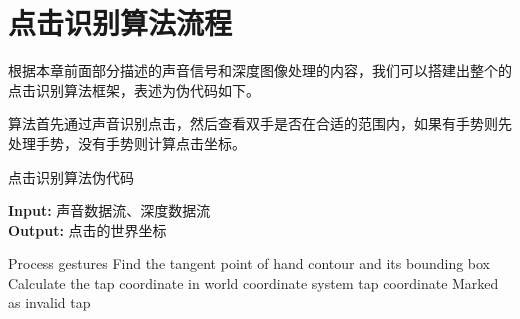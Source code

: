 \section{点击识别算法流程}
根据本章前面部分描述的声音信号和深度图像处理的内容，我们可以搭建出整个的点击识别算法框架，表述为伪代码如下。

算法首先通过声音识别点击，然后查看双手是否在合适的范围内，如果有手势则先处理手势，没有手势则计算点击坐标。
\begin{algorithm}[h]
  \caption{点击识别算法伪代码} %
  \hspace*{0.02in} {\bf Input:} %
  声音数据流、深度数据流\\
  \hspace*{0.02in} {\bf Output:} %
  点击的世界坐标
  \begin{algorithmic}[1]
        \State Process gestures
      \Else
        \State Find the tangent point of hand contour and its bounding box
        \State Calculate the tap coordinate in world coordinate system
        \State \Return tap coordinate
      \EndIf
    \Else 
      \State Marked as invalid tap 
      \State \Return
    \EndIf
  \EndIf
  \end{algorithmic}
\end{algorithm}